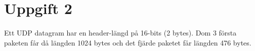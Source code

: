 \section{Uppgift 2}
\paragraph{}
Ett UDP datagram har en header-längd på 16-bits (2 bytes). Dom 3 första paketen får då längden 1024 bytes och det fjärde paketet får längden 476 bytes. 
